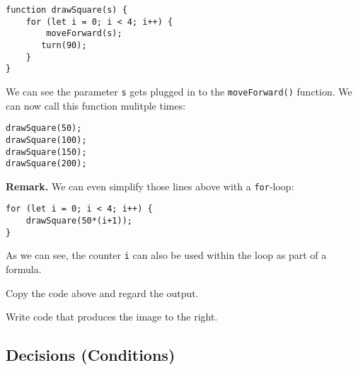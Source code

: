 \documentclass[english,11pt,a4paper]{report}
\begin{document}
\begin{verbatim}
function drawSquare(s) {
    for (let i = 0; i < 4; i++) {
        moveForward(s);
       turn(90);
    }
}
\end{verbatim}
We can see the parameter \verb|s| gets plugged in to the \verb|moveForward()| function. We can now call this function mulitple times: 
\begin{verbatim}
drawSquare(50);
drawSquare(100);
drawSquare(150);
drawSquare(200);
\end{verbatim}

{\bf Remark. } We can even simplify those lines above with a \verb|for|-loop:
\begin{verbatim}
for (let i = 0; i < 4; i++) {
    drawSquare(50*(i+1));
}
\end{verbatim}

As we can see, the counter \verb|i| can also be used within the loop as part of a formula.
\begin{ex}
Copy the code above and regard the output.
\end{ex}

\begin{ex}
\begin{multicols}{2}
Write code that produces the image to the right.

\end{multicols}
\end{ex}





\subsection{Decisions (Conditions)}
\end{document}
